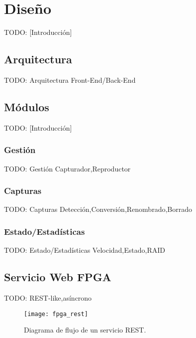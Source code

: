 \chapter{Diseño\label{cap:disenho}}

TODO: [Introducción]


\section{Arquitectura\label{sec:dis:arquitectura}}

TODO: Arquitectura
  {Front-End/Back-End}


\section{Módulos\label{sec:dis:modulos}}

TODO: [Introducción]


\subsection{Gestión\label{ssec:dis:gestion}}

TODO: Gestión
  {Capturador,Reproductor}


\subsection{Capturas\label{ssec:dis:capturas}}

TODO: Capturas
  {Detección,Conversión,Renombrado,Borrado}


\subsection{Estado/Estadísticas\label{ssec:dis:estado_estadisticas}}

TODO: Estado/Estadísticas
  {Velocidad,Estado,RAID}


\section{Servicio Web FPGA\label{sec:dis:servicio_web_fpga}}

TODO: 
  {REST-like,asíncrono}

\begin{figure}[!htp]
  \centering
  \texttt{[image: fpga\_rest]}
  \caption{Diagrama de flujo de un servicio \gls{REST}.}
  \label{fig:fpga_rest}
\end{figure}

